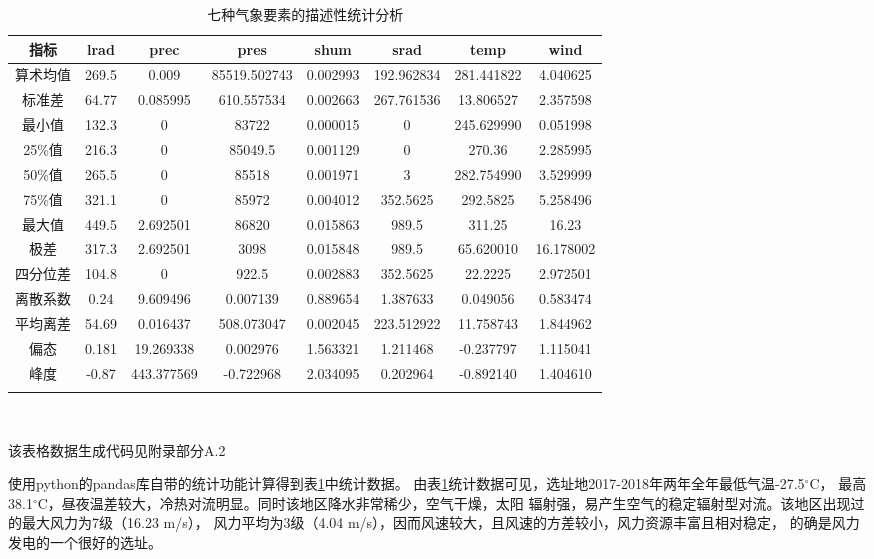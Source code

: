 \documentclass[AutoFakeBold]{LZUThesis}
\begin{document}
\begin{table}[H]
    \centering
    \caption{七种气象要素的描述性统计分析}
    \begin{tabular}{cccccccc}
    \toprule
    指标 & lrad & prec & pres & shum & srad & temp & wind \\
    \midrule
    算术均值 & 269.5 & 0.009 & 85519.502743 & 0.002993 & 192.962834 & 281.441822 & 4.040625 \\
    标准差 & 64.77 & 0.085995 & 610.557534 & 0.002663 & 267.761536 & 13.806527 & 2.357598 \\
    最小值 & 132.3 & 0 & 83722 & 0.000015 & 0 & 245.629990 & 0.051998 \\
    25\%值 & 216.3 & 0 & 85049.5 & 0.001129 & 0 & 270.36 & 2.285995 \\
    50\%值 & 265.5 & 0 & 85518 & 0.001971 & 3 & 282.754990 & 3.529999 \\
    75\%值 & 321.1 & 0 & 85972 & 0.004012 & 352.5625 & 292.5825 & 5.258496 \\
    最大值 & 449.5 & 2.692501 & 86820 & 0.015863 & 989.5 & 311.25 & 16.23 \\
    极差 & 317.3 & 2.692501 & 3098 & 0.015848 & 989.5 & 65.620010 & 16.178002 \\
    四分位差 & 104.8 & 0 & 922.5 & 0.002883 & 352.5625 & 22.2225 & 2.972501 \\
    离散系数 & 0.24 & 9.609496 & 0.007139 & 0.889654 & 1.387633 & 0.049056 & 0.583474 \\
    平均离差 & 54.69 & 0.016437 & 508.073047 & 0.002045 & 223.512922 & 11.758743 & 1.844962 \\
    偏态 & 0.181 & 19.269338 & 0.002976 & 1.563321 & 1.211468 & -0.237797 & 1.115041 \\
    峰度 & -0.87 & 443.377569 & -0.722968 & 2.034095 & 0.202964 & -0.892140 & 1.404610 \\
    \bottomrule \\
    \end{tabular} \\
    \raggedright
    \footnotesize{该表格数据生成代码见附录部分A.2}
    \label{analysis}
\end{table}

使用python的pandas库自带的统计功能计算得到表\ref{analysis}中统计数据。
由表\ref{analysis}统计数据可见，选址地2017-2018年两年全年最低气温-27.5$^{\circ}$C，
最高38.1$^{\circ}$C，昼夜温差较大，冷热对流明显。同时该地区降水非常稀少，空气干燥，太阳
辐射强，易产生空气的稳定辐射型对流。该地区出现过的最大风力为7级（16.23 m/s），
风力平均为3级（4.04 m/s），因而风速较大，且风速的方差较小，风力资源丰富且相对稳定，
的确是风力发电的一个很好的选址。
\end{document}
